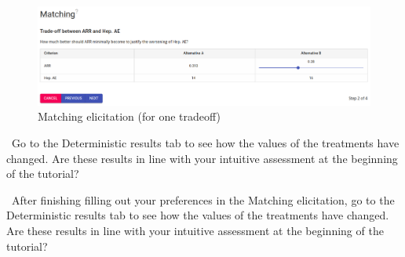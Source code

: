 \documentclass[00_mcda_tutorial.tex]{subfiles}
\begin{document}
\begin{figure}[!h]
  \centering
  \includegraphics[width=\textwidth]{fig/matching1.png}
  \caption{Matching elicitation (for one tradeoff)}
  \label{fig:matching1}
\end{figure}

\noindent \leftpointright \, Go to the Deterministic results tab to see how the values of the treatments have changed. Are these results in line with your intuitive assessment at the beginning of the tutorial?

\noindent \leftpointright \, After finishing filling out your preferences in the Matching elicitation, go to the Deterministic results tab to see how the values of the treatments have changed. Are these results in line with your intuitive assessment at the beginning of the tutorial?
\end{document}
